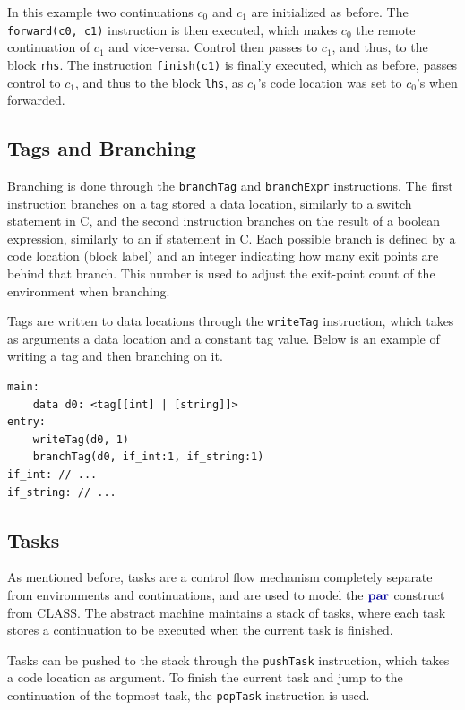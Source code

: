 In this example two continuations $c_0$ and $c_1$ are initialized as before. The \texttt{forward(c0, c1)} instruction is then executed, which makes $c_0$ the remote continuation of $c_1$ and vice-versa. Control then passes to $c_1$, and thus, to the block \texttt{rhs}. The instruction \texttt{finish(c1)} is finally executed, which as before, passes control to $c_1$, and thus to the block \texttt{lhs}, as $c_1$'s code location was set to $c_0$'s when forwarded.

\subsection{Tags and Branching} \label{subsection:Branching}

Branching is done through the \texttt{branchTag} and \texttt{branchExpr} instructions. The first instruction branches on a tag stored a data location, similarly to a switch statement in C, and the second instruction branches on the result of a boolean expression, similarly to an if statement in C. Each possible branch is defined by a code location (block label) and an integer indicating how many exit points are behind that branch. This number is used to adjust the exit-point count of the environment when branching.

Tags are written to data locations through the \texttt{writeTag} instruction, which takes as arguments a data location and a constant tag value. Below is an example of writing a tag and then branching on it.

\begin{lstlisting}[language=IR,frame=bottom]
main:
    data d0: <tag[[int] | [string]]>
entry:
    writeTag(d0, 1)
    branchTag(d0, if_int:1, if_string:1)
if_int: // ...
if_string: // ...
\end{lstlisting}

\subsection{Tasks}

As mentioned before, tasks are a control flow mechanism completely separate from environments and continuations, and are used to model the $\parp$ construct from \ac{CLASS}. The abstract machine maintains a stack of tasks, where each task stores a continuation to be executed when the current task is finished.

Tasks can be pushed to the stack through the \texttt{pushTask} instruction, which takes a code location as argument. To finish the current task and jump to the continuation of the topmost task, the \texttt{popTask} instruction is used.

